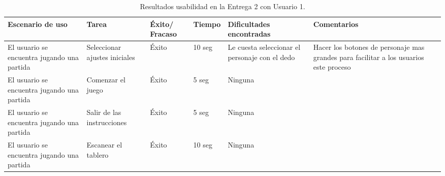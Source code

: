 \begin{table}[h]
  \begin{center}
    \begin{tabular}{|p{2.5cm}|p{1.75cm}|p{1.25cm}|p{1.25cm}|p{2.75cm}|p{3.5cm}|}

      \hline
        \rowcolor{Gray} \textbf{Escenario de uso}
        & \textbf{Tarea}
        & \textbf{Éxito/ Fracaso}
        & \textbf{Tiempo}
        & \textbf{Dificultades encontradas}
        & \textbf{Comentarios}\\

      \hline
      El usuario se encuentra jugando una partida
      & Seleccionar ajustes iniciales
      & Éxito
      & 10 seg
      & Le cuesta seleccionar el personaje con el dedo
      & Hacer los botones de personaje mas grandes para facilitar a los usuarios este proceso\\

      \hline
      El usuario se encuentra jugando una partida
      & Comenzar el juego
      & Éxito
      & 5 seg
      & Ninguna
      &\\

      \hline
      El usuario se encuentra jugando una partida
      & Salir de las instrucciones
      & Éxito
      & 5 seg
      & Ninguna
      &\\

      \hline
      El usuario se encuentra jugando una partida
      & Escanear el tablero
      & Éxito
      & 10 seg
      & Ninguna
      &\\

      \hline

    \end{tabular}

    \caption{Resultados usabilidad en la Entrega 2 con Usuario 1.}
    \label{tabla-entrega-2-usuario1}

  \end{center}
\end{table}


